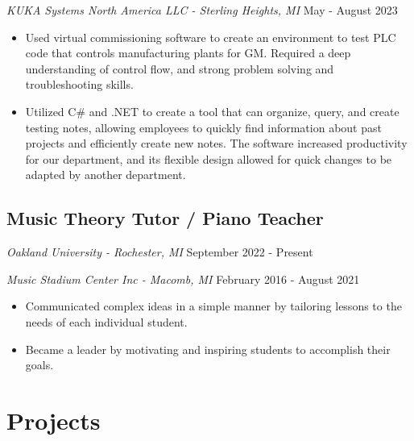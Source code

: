 \documentclass{article}
\newcommand{\resumesection}[1]{
	\section*{\Large\textbf{#1}}
	\hrulefill
	\vspace{1ex}
}
\begin{document}
\textit{KUKA Systems North America LLC - Sterling Heights, MI} \hfill {May - August 2023}

\begin{itemize}
	\item Used virtual commissioning software to create an environment to test PLC code that controls manufacturing plants for GM. Required a deep understanding of control flow, and strong problem solving and troubleshooting skills.
	\item Utilized C\# and .NET to create a tool that can organize, query, and create testing notes, allowing employees to quickly find information about past projects and efficiently create new notes. The software increased productivity for our department, and its flexible design allowed for quick changes to be adapted by another department.
\end{itemize}

\subsection*{Music Theory Tutor / Piano Teacher}

\textit{Oakland University - Rochester, MI} \hfill {September 2022 - Present}

\textit{Music Stadium Center Inc - Macomb, MI } \hfill {February 2016 - August 2021}

\begin{itemize}
	\item Communicated complex ideas in a simple manner by tailoring lessons to the needs of each individual student.
	\item Became a leader by motivating and inspiring students to accomplish their goals.
\end{itemize}


\resumesection{Projects}


\end{document}
